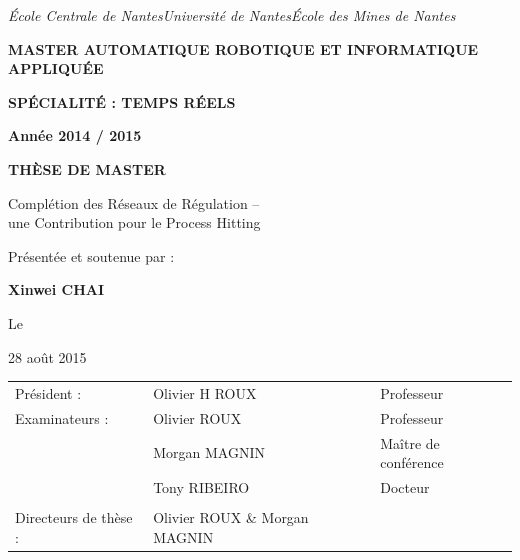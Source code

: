 \documentclass[11pt]{report}
\theoremstyle{definition}
\begin{document}
\setcounter{page}{0}
\thispagestyle{empty}
\begin{center}
{\Large\textit{\'Ecole Centrale de Nantes\quad  Universit\'e de Nantes\quad \'Ecole des Mines de Nantes}}

	\vspace{1cm}
	
{\uppercase{\textbf{{\Large M}aster {\Large A}utomatique {\Large R}obotique et {\Large I}nformatique {\Large A}ppliqu\'ee}}}

{\uppercase{\textbf{{\Large S}p\'ecialit\'e : {\Large T}emps {\Large R}\'eels}}}

	{\textbf{\Large Ann\'ee 2014 / 2015}}
	
\begin{minipage}{0.75\linewidth}
	\centering
	\vspace{1cm}
    
    {\uppercase{\LARGE \textbf{th\`ese de master}}}
    
    \vspace{2cm}
    {\Large Compl\'etion des R\'eseaux de R\'egulation --\\ une Contribution pour le Process Hitting }
    
    \vspace{2cm}
	{\Large Pr\'esent\'ee et soutenue par : }
	
    {\Large \textbf {Xinwei CHAI}}
    
    \vspace{1cm}
    
	{\Large Le}
	
    {\Large 28 ao\^ut 2015}
    
    \vspace{2cm}
    \end{minipage}
\end{center}
    \begin{tabular}{lll}

    Pr\'esident : &Olivier H R{\small OUX}&Professeur\\
    Examinateurs : &Olivier R{\small OUX} &Professeur\\
    &Morgan M{\small AGNIN}&Ma\^itre de conf\'erence\\
    &Tony R{\small IBEIRO}&Docteur\\
    &&\\
    Directeurs de th\`ese : &Olivier R{\small OUX} \& Morgan M{\small AGNIN}&
    \end{tabular}
    \vspace{1cm}
\end{document}
